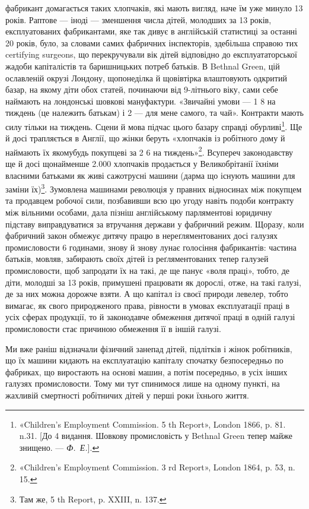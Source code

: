 \parcont{}  %
фабрикант домагається таких хлопчаків, які мають вигляд, наче
їм уже минуло 13 років. Раптове — іноді — зменшення числа
дітей, молодших за 13 років, експлуатованих фабрикантами, яке
так дивує в англійській статистиці за останні 20 років, було, за
словами самих фабричних інспекторів, здебільша справою тих
certifying surgeons, що перекручували вік дітей відповідно до
експлуататорської жадоби капіталістів та баришницьких потреб
батьків. В Bethnal Green, цій ославленій окрузі Лондону, щопонеділка
й щовівтірка влаштовують одкритий базар, на якому
діти обох статей, починаючи від 9-літнього віку, сами себе наймають
на лондонські шовкові мануфактури. «Звичайні умови —
1 8 на тиждень (це належить батькам) і 2 —
для мене самого, та чай». Контракти мають силу тільки на тиждень.
Сцени й мова підчас цього базару справді обурливі\footnote{
«Children’s Employment Commission. 5 th Report», London 1866,
p. 81. n.31. [До 4 видання. Шовкову промисловість у Bethnal Green тепер
майже знищено. — \emph{Ф.~Е.}].
}. Ще й досі
трапляється в Англії, що жінки беруть «хлопчаків із робітного
дому й наймають їх якомубудь покупцеві за 2
6 на тиждень»\footnote{
«Children’s Employment Commission. 3 rd Report», London 1864,
p. 53, n. 15.
}. Всупереч законодавству ще й досі щонайменше
\num{2.000} хлопчаків продається у Великобрітанії їхніми
власними батьками як живі сажотрусні машини (дарма що існують
машини для заміни їх)\footnote{
Там же, 5 th Report, p. XXIII, n. 137.
}. Зумовлена машинами революція у
правних відносинах між покупцем та продавцем робочої сили,
позбавивши всю цю угоду навіть подоби контракту між вільними
особами, дала пізніш англійському парляментові юридичну
підставу виправдуватися за втручання держави у фабричний
режим. Щоразу, коли фабричний закон обмежує дитячу працю
в нереґляментованих досі галузях промисловости 6 годинами,
знову й знову лунає голосіння фабрикантів: частина батьків,
мовляв, забирають своїх дітей із реґляментованих тепер галузей
промисловости, щоб запродати їх на такі, де ще панує «воля
праці», тобто, де діти, молодші за 13 років, примушені працювати
як дорослі, отже, на такі галузі, де за них можна дорожче
взяти. А що капітал із своєї природи левелер, тобто вимагає,
як свого природженого права, рівности в умовах експлуатації
праці в усіх сферах продукції, то й законодавче обмеження дитячої
праці в одній галузі промисловости стає причиною обмеження
її в іншій галузі.

Ми вже раніш відзначали фізичний занепад дітей, підлітків
і жінок робітників, що їх машини кидають на експлуатацію капіталу
спочатку безпосередньо по фабриках, що виростають на
основі машин, а потім посередньо, в усіх інших галузях промисловости.
Тому ми тут спинимося лише на одному пункті, на жахливій
смертності робітничих дітей у перші роки їхнього життя.
\parbreak{}  %
